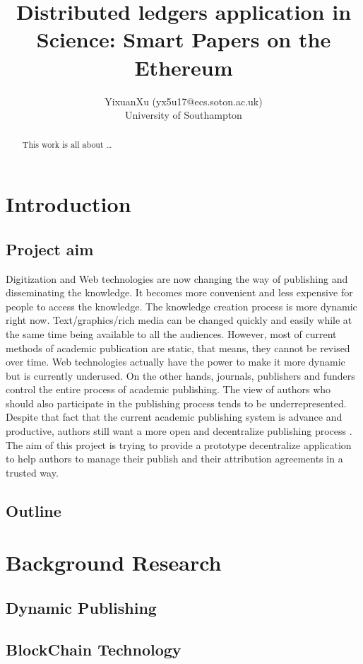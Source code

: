 \documentclass [12pt]{article}
\title{Distributed ledgers application in Science: Smart
Papers on the Ethereum}
\author{YixuanXu (yx5u17@ecs.soton.ac.uk)\\University of Southampton}
\begin{document}
\maketitle
\newpage
\tableofcontents
\newpage
\listoffigures
\newpage
\listoftables
\newpage
\begin{abstract}
	This work is all about \dots
\end{abstract}
\newpage
\section{Introduction}
\subsection{Project aim}
Digitization and Web technologies are now changing the way of publishing and disseminating the knowledge.
It becomes more convenient and less expensive for people to access the knowledge. 
The knowledge creation process is more dynamic right now. 
Text/graphics/rich media can be changed quickly and easily while at the same time being available to all the audiences.
However, most of current methods of academic publication are static, that means, they cannot be revised over time\cite{heller2014dynamic}. 
Web technologies actually have the power to make it more dynamic but is currently underused. On the other hands, journals, publishers and funders control
the entire process of academic publishing. The view of authors who should also participate in the publishing process tends to be underrepresented. 
Despite that fact that the current academic publishing system is advance and productive, 
authors still want a more open and decentralize publishing process \cite{d2018authors}.
The aim of this project is trying to provide a prototype decentralize application 
to help authors to manage their publish and their attribution agreements in a trusted way. 
\subsection{Outline}
\section{Background Research}
\subsection{Dynamic Publishing}
\subsection{BlockChain Technology}
\end{document}
